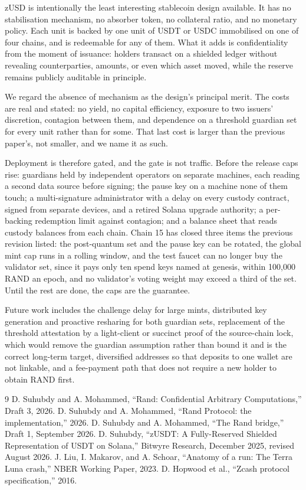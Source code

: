 \documentclass[11pt,a4paper]{article}
\begin{document}
zUSD is intentionally the least interesting stablecoin design available. It has no stabilisation mechanism, no absorber token, no collateral ratio, and no monetary policy. Each unit is backed by one unit of USDT or USDC immobilised on one of four chains, and is redeemable for any of them. What it adds is confidentiality from the moment of issuance: holders transact on a shielded ledger without revealing counterparties, amounts, or even which asset moved, while the reserve remains publicly auditable in principle.

We regard the absence of mechanism as the design's principal merit. The costs are real and stated: no yield, no capital efficiency, exposure to two issuers' discretion, contagion between them, and dependence on a threshold guardian set for every unit rather than for some. That last cost is larger than the previous paper's, not smaller, and we name it as such.

Deployment is therefore gated, and the gate is not traffic. Before the release caps rise: guardians held by independent operators on separate machines, each reading a second data source before signing; the pause key on a machine none of them touch; a multi-signature administrator with a delay on every custody contract, signed from separate devices, and a retired Solana upgrade authority; a per-backing redemption limit against contagion; and a balance sheet that reads custody balances from each chain. Chain 15 has closed three items the previous revision listed: the post-quantum set and the pause key can be rotated, the global mint cap runs in a rolling window, and the test faucet can no longer buy the validator set, since it pays only ten spend keys named at genesis, within 100,000 RAND an epoch, and no validator's voting weight may exceed a third of the set. Until the rest are done, the caps are the guarantee.

Future work includes the challenge delay for large mints, distributed key generation and proactive resharing for both guardian sets, replacement of the threshold attestation by a light-client or succinct proof of the source-chain lock, which would remove the guardian assumption rather than bound it and is the correct long-term target, diversified addresses so that deposits to one wallet are not linkable, and a fee-payment path that does not require a new holder to obtain RAND first.


\begin{thebibliography}{9}
 D. Suhubdy and A. Mohammed, ``Rand: Confidential Arbitrary Computations,'' Draft 3, 2026.
 D. Suhubdy and A. Mohammed, ``Rand Protocol: the implementation,'' 2026.
 D. Suhubdy and A. Mohammed, ``The Rand bridge,'' Draft 1, September 2026.
 D. Suhubdy, ``zUSDT: A Fully-Reserved Shielded Representation of USDT on Solana,'' Bitwyre Research, December 2025, revised August 2026.
 J. Liu, I. Makarov, and A. Schoar, ``Anatomy of a run: The Terra Luna crash,'' NBER Working Paper, 2023.
 D. Hopwood et al., ``Zcash protocol specification,'' 2016.
\end{thebibliography}
\end{document}
